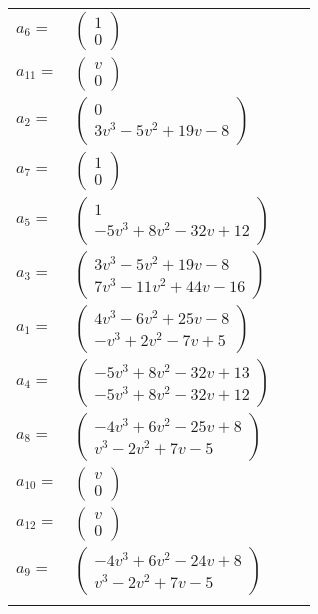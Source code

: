 \documentclass[1p]{elsarticle_modified}
\theoremstyle{definition}
\begin{document}
\begin{tabular}{m{7pt} m{180pt} m{7pt} m{180pt} }
\flushright $a_{6}=$&$\begin{pmatrix}1\\0\end{pmatrix}$ \\
\flushright $a_{11}=$&$\begin{pmatrix}v\\0\end{pmatrix}$ \\
\flushright $a_{2}=$&$\begin{pmatrix}0\\3 v^3-5 v^2+19 v-8\end{pmatrix}$ \\
\flushright $a_{7}=$&$\begin{pmatrix}1\\0\end{pmatrix}$ \\
\flushright $a_{5}=$&$\begin{pmatrix}1\\-5 v^3+8 v^2-32 v+12\end{pmatrix}$ \\
\flushright $a_{3}=$&$\begin{pmatrix}3 v^3-5 v^2+19 v-8\\7 v^3-11 v^2+44 v-16\end{pmatrix}$ \\
\flushright $a_{1}=$&$\begin{pmatrix}4 v^3-6 v^2+25 v-8\\- v^3+2 v^2-7 v+5\end{pmatrix}$ \\
\flushright $a_{4}=$&$\begin{pmatrix}-5 v^3+8 v^2-32 v+13\\-5 v^3+8 v^2-32 v+12\end{pmatrix}$ \\
\flushright $a_{8}=$&$\begin{pmatrix}-4 v^3+6 v^2-25 v+8\\v^3-2 v^2+7 v-5\end{pmatrix}$ \\
\flushright $a_{10}=$&$\begin{pmatrix}v\\0\end{pmatrix}$ \\
\flushright $a_{12}=$&$\begin{pmatrix}v\\0\end{pmatrix}$ \\
\flushright $a_{9}=$&$\begin{pmatrix}-4 v^3+6 v^2-24 v+8\\v^3-2 v^2+7 v-5\end{pmatrix}$\\&\end{tabular}
\end{document}
